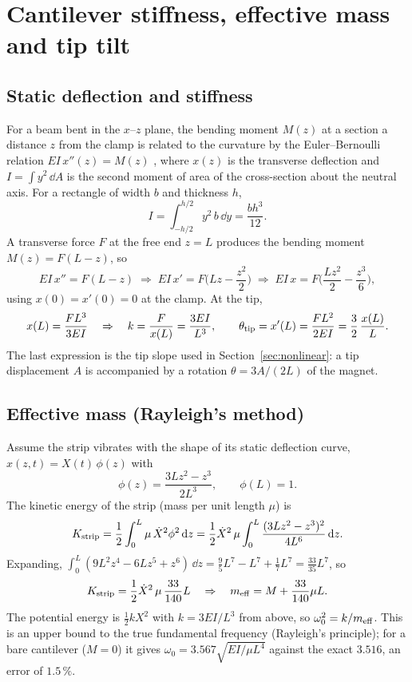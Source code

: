 \clearpage
\section{Cantilever stiffness, effective mass and tip tilt}\label{app:cantilever}

\subsection{Static deflection and stiffness}

For a beam bent in the $x$--$z$ plane, the bending moment $M(z)$ at a section a distance $z$ from the clamp is related to the curvature by the Euler--Bernoulli relation $EI\,x''(z)=M(z)$ \cite{gere}, where $x(z)$ is the transverse deflection and $I=\int y^2\,\dd A$ is the second moment of area of the cross-section about the neutral axis. For a rectangle of width $b$ and thickness $h$,
\begin{equation}
I=\int_{-h/2}^{h/2}y^2\,b\,\dd y=\frac{bh^3}{12}.
\end{equation}
A transverse force $F$ at the free end $z=L$ produces the bending moment $M(z)=F(L-z)$, so
\begin{equation}
EI\,x''=F(L-z)\;\Rightarrow\;EI\,x'=F\Big(Lz-\frac{z^2}{2}\Big)\;\Rightarrow\;EI\,x=F\Big(\frac{Lz^2}{2}-\frac{z^3}{6}\Big),
\end{equation}
using $x(0)=x'(0)=0$ at the clamp. At the tip,
\begin{equation}
x(L)=\frac{FL^3}{3EI}\quad\Rightarrow\quad k=\frac{F}{x(L)}=\frac{3EI}{L^3},
\qquad
\theta_{\rm tip}=x'(L)=\frac{FL^2}{2EI}=\frac{3}{2}\,\frac{x(L)}{L}.
\end{equation}
The last expression is the tip slope used in Section~\ref{sec:nonlinear}: a tip displacement $A$ is accompanied by a rotation $\theta=3A/(2L)$ of the magnet.

\subsection{Effective mass (Rayleigh's method)}

Assume the strip vibrates with the shape of its static deflection curve, $x(z,t)=X(t)\,\phi(z)$ with
\begin{equation}
\phi(z)=\frac{3Lz^2-z^3}{2L^3},\qquad \phi(L)=1 .
\end{equation}
The kinetic energy of the strip (mass per unit length $\mu$) is
\begin{equation}
K_{\rm strip}=\frac12\int_0^L\mu\,\dot X^2\phi^2\,\mathrm{d} z=\frac12\dot X^2\,\mu\int_0^L\frac{(3Lz^2-z^3)^2}{4L^6}\,\mathrm{d} z .
\end{equation}
Expanding, $\int_0^L(9L^2z^4-6Lz^5+z^6)\,\dd z=\frac95L^7-L^7+\frac17L^7=\frac{33}{35}L^7$, so
\begin{equation}
K_{\rm strip}=\frac12\dot X^2\,\mu\,\frac{33}{140}L\quad\Rightarrow\quad m_{\rm eff}=M+\frac{33}{140}\mu L .
\end{equation}
The potential energy is $\frac12kX^2$ with $k=3EI/L^3$ from above, so $\omega_0^2=k/m_{\rm eff}$. This is an upper bound to the true fundamental frequency (Rayleigh's principle); for a bare cantilever ($M=0$) it gives $\omega_0=3.567\sqrt{EI/\mu L^4}$ against the exact $3.516$, an error of $1.5\,\%$.

